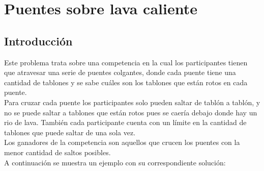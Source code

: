 \section{Puentes sobre lava caliente}


\subsection{Introducci\'on}

Este problema trata sobre una competencia en la cual los participantes tienen que atravesar una serie de puentes colgantes, donde cada puente tiene una cantidad de tablones y se sabe cuáles son los tablones que están rotos en cada puente. \\
Para cruzar cada puente los participantes solo pueden saltar de tablón a tablón, y no se puede saltar a tablones que están rotos pues se caería debajo donde hay un rio de lava. También cada participante cuenta con un límite en la cantidad de tablones que puede saltar de una sola vez. \\
Los ganadores de la competencia son aquellos que crucen los puentes con la menor cantidad de saltos posibles. \\
A continuación se muestra un ejemplo con su correspondiente solución: \\

